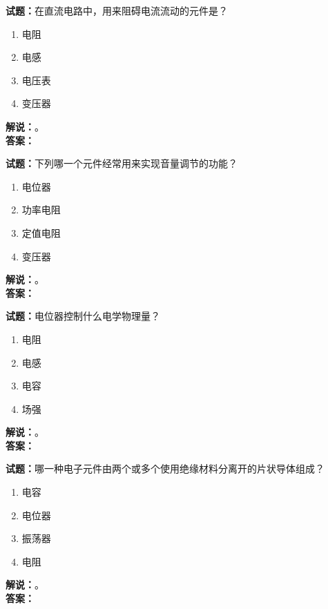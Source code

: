 \documentclass{ctexbook}
\begin{document}
\bigskip




\noindent\textbf{试题：}在直流电路中，用来阻碍电流流动的元件是？
\begin{enumerate}[leftmargin=3em]
\item 电阻
\item 电感
\item 电压表
\item 变压器
\end{enumerate}
\noindent\textbf{解说：}\textbf{}。\\\noindent\textbf{答案：}

\bigskip




\noindent\textbf{试题：}下列哪一个元件经常用来实现音量调节的功能？
\begin{enumerate}[leftmargin=3em]
\item 电位器
\item 功率电阻
\item 定值电阻
\item 变压器
\end{enumerate}
\noindent\textbf{解说：}\textbf{}。\\\noindent\textbf{答案：}

\bigskip




\noindent\textbf{试题：}电位器控制什么电学物理量？
\begin{enumerate}[leftmargin=3em]
\item 电阻
\item 电感
\item 电容
\item 场强
\end{enumerate}
\noindent\textbf{解说：}\textbf{}。\\\noindent\textbf{答案：}

\bigskip




\noindent\textbf{试题：}哪一种电子元件由两个或多个使用绝缘材料分离开的片状导体组成？
\begin{enumerate}[leftmargin=3em]
\item 电容
\item 电位器
\item 振荡器
\item 电阻
\end{enumerate}
\noindent\textbf{解说：}\textbf{}。\\\noindent\textbf{答案：}

\bigskip
\end{document}
